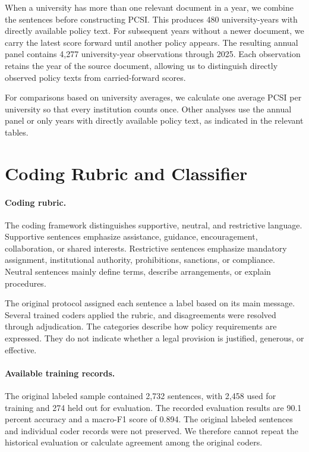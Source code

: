 \documentclass[11pt]{article}
\begin{document}
When a university has more than one relevant document in a year, we combine the sentences before constructing PCSI. This produces 480 university-years with directly available policy text. For subsequent years without a newer document, we carry the latest score forward until another policy appears. The resulting annual panel contains 4,277 university-year observations through 2025. Each observation retains the year of the source document, allowing us to distinguish directly observed policy texts from carried-forward scores.

For comparisons based on university averages, we calculate one average PCSI per university so that every institution counts once. Other analyses use the annual panel or only years with directly available policy text, as indicated in the relevant tables.

\section{Coding Rubric and Classifier}\label{app:model}
\setcounter{table}{0}

\paragraph{Coding rubric.}
The coding framework distinguishes supportive, neutral, and restrictive language. Supportive sentences emphasize assistance, guidance, encouragement, collaboration, or shared interests. Restrictive sentences emphasize mandatory assignment, institutional authority, prohibitions, sanctions, or compliance. Neutral sentences mainly define terms, describe arrangements, or explain procedures.

The original protocol assigned each sentence a label based on its main message. Several trained coders applied the rubric, and disagreements were resolved through adjudication. The categories describe how policy requirements are expressed. They do not indicate whether a legal provision is justified, generous, or effective.

\paragraph{Available training records.}
The original labeled sample contained 2,732 sentences, with 2,458 used for training and 274 held out for evaluation. The recorded evaluation results are 90.1 percent accuracy and a macro-F1 score of 0.894. The original labeled sentences and individual coder records were not preserved. We therefore cannot repeat the historical evaluation or calculate agreement among the original coders.
\end{document}
